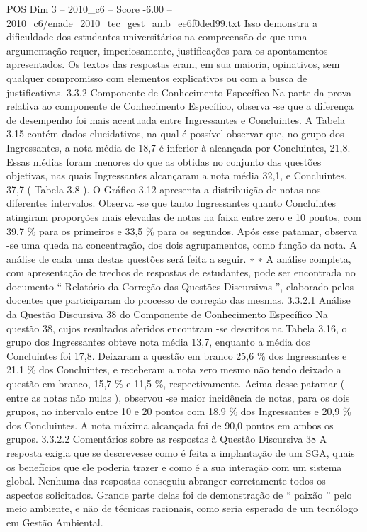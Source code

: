 \begin{textsample}{POS Dim 3 – 2010\_c6 – Score -6.00 – 2010\_c6/enade\_2010\_tec\_gest\_amb\_ee6f0ded99.txt}
Isso demonstra a dificuldade dos estudantes universitários na compreensão de que uma argumentação requer, imperiosamente, justificações para os apontamentos apresentados.
Os textos das respostas eram, em sua maioria, opinativos, sem qualquer compromisso com elementos explicativos ou com a busca de justificativas. 3.3.2 Componente de Conhecimento Específico Na parte da prova relativa ao componente de Conhecimento Específico, observa -se que a diferença de desempenho foi mais acentuada entre Ingressantes e Concluintes.
A Tabela 3.15 contém dados elucidativos, na qual é possível observar que, no grupo dos Ingressantes, a nota média de 18,7 é inferior à alcançada por Concluintes, 21,8.
Essas médias foram menores do que as obtidas no conjunto das questões objetivas, nas quais Ingressantes alcançaram a nota média 32,1, e Concluintes, 37,7 ( Tabela 3.8 ).
O Gráfico 3.12 apresenta a distribuição de notas nos diferentes intervalos.
Observa -se que tanto Ingressantes quanto Concluintes atingiram proporções mais elevadas de notas na faixa entre zero e 10 pontos, com 39,7 \% para os primeiros e 33,5 \% para os segundos.
Após esse patamar, observa -se uma queda na concentração, dos dois agrupamentos, como função da nota.
A análise de cada uma destas questões será feita a seguir. ∗ ∗ A análise completa, com apresentação de trechos de respostas de estudantes, pode ser encontrada no documento “ Relatório da Correção das Questões Discursivas ”, elaborado pelos docentes que participaram do processo de correção das mesmas. 3.3.2.1 Análise da Questão Discursiva 38 do Componente de Conhecimento Específico Na questão 38, cujos resultados aferidos encontram -se descritos na Tabela 3.16, o grupo dos Ingressantes obteve nota média 13,7, enquanto a média dos Concluintes foi 17,8.
Deixaram a questão em branco 25,6 \% dos Ingressantes e 21,1 \% dos Concluintes, e receberam a nota zero mesmo não tendo deixado a questão em branco, 15,7 \% e 11,5 \%, respectivamente.
Acima desse patamar ( entre as notas não nulas ), observou -se maior incidência de notas, para os dois grupos, no intervalo entre 10 e 20 pontos com 18,9 \% dos Ingressantes e 20,9 \% dos Concluintes.
A nota máxima alcançada foi de 90,0 pontos em ambos os grupos. 3.3.2.2 Comentários sobre as respostas à Questão Discursiva 38 A resposta exigia que se descrevesse como é feita a implantação de um SGA, quais os benefícios que ele poderia trazer e como é a sua interação com um sistema global.
Nenhuma das respostas conseguiu abranger corretamente todos os aspectos solicitados.
Grande parte delas foi de demonstração de “ paixão ” pelo meio ambiente, e não de técnicas racionais, como seria esperado de um tecnólogo em Gestão Ambiental.

\end{textsample}
